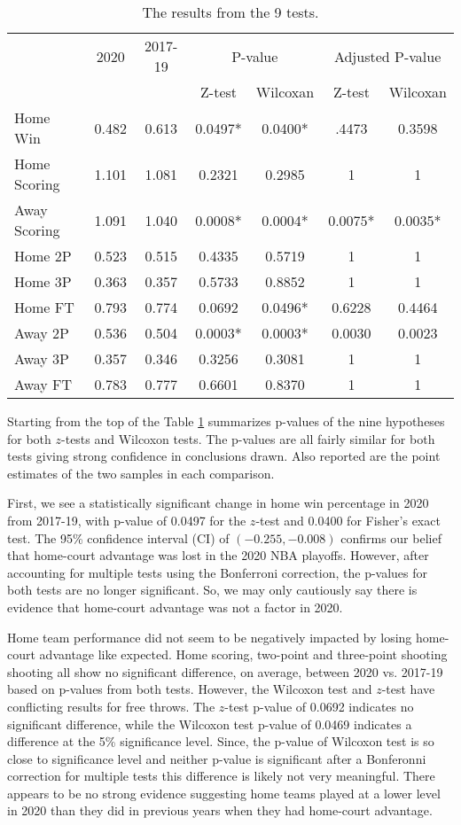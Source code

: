 \documentclass[12pt, letterpaper, titlepage]{article}
\begin{document}
\begin{table}
  \caption{The results from the 9 tests.}
  \label{tab:table}
\centering
\begin{tabular}[t]{lcccccc}
  & 2020 & 2017-19 & \multicolumn{2}{c}{P-value} & \multicolumn{2}{c}{Adjusted P-value}\\
  &          &                & Z-test & Wilcoxan & Z-test & Wilcoxan\\
Home Win & 0.482 & 0.613 & 0.0497* & 0.0400* & .4473 & 0.3598\\
Home Scoring & 1.101 & 1.081 & 0.2321 & 0.2985 & 1 & 1\\
Away Scoring & 1.091 & 1.040 & 0.0008* & 0.0004* & 0.0075* & 0.0035*\\
Home 2P & 0.523 & 0.515 & 0.4335 & 0.5719 & 1 & 1\\
Home 3P & 0.363 & 0.357 & 0.5733 & 0.8852 & 1 & 1\\
Home FT & 0.793 & 0.774 & 0.0692 & 0.0496* & 0.6228 & 0.4464\\
Away 2P & 0.536 & 0.504 & 0.0003* & 0.0003* & 0.0030 & 0.0023\\
Away 3P & 0.357 & 0.346 & 0.3256 & 0.3081 & 1 & 1\\
Away FT & 0.783 & 0.777 & 0.6601 & 0.8370 & 1 & 1\\
\end{tabular}
\end{table}

Starting from the top of the
Table \ref{tab:table} summarizes p-values of the nine hypotheses for both
\(z\)-tests and Wilcoxon tests. The p-values are all fairly similar for both
tests giving strong confidence in conclusions drawn. Also reported are
the point estimates of the two samples in each comparison.

First, we see a statistically significant change
in home win percentage in 2020 from 2017-19, with p-value of 0.0497 for the
\(z\)-test and 0.0400 for Fisher's exact test. The 95\% confidence
interval (CI) of \((-0.255, -0.008)\)
confirms our belief that home-court advantage was lost in the 2020 NBA playoffs. However, after accounting for
multiple tests using the Bonferroni correction, the p-values for both tests are no longer significant.
So, we may only cautiously say there is evidence that home-court advantage was
not a factor in 2020.

Home team performance did not seem to be negatively impacted by losing home-court
advantage like expected. Home scoring, two-point and three-point shooting
shooting all show no significant difference, on average, between 2020 vs.
2017-19 based on p-values from both tests. However, the Wilcoxon test and \(z\)-test have conflicting results
for free throws. The \(z\)-test p-value of 0.0692 indicates no significant difference, while
the Wilcoxon test p-value of 0.0469 indicates a difference at the 5\% significance level. Since,
the p-value of Wilcoxon test is so close to significance level and neither p-value is significant
after a Bonferonni correction for multiple tests this difference is likely not very meaningful.
There appears to be no strong evidence suggesting home teams played at
a lower level in 2020 than they did in previous years when they had home-court advantage.
\end{document}
